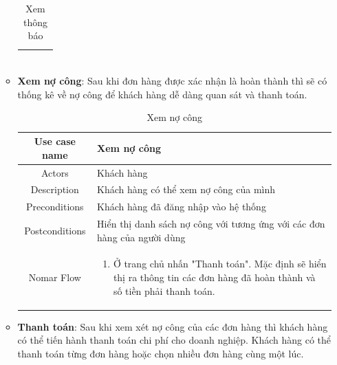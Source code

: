 \begin{itemize}
\begin{itemize}
\begin{table}[!htp]
\begin{tabular}{|c|m{25em}|}
\begin{enumerate}
					\end{enumerate}
					\\
					\hline
				\end{tabular}
				\caption{Xem thông báo}
			\end{table}
		
			\item \textbf{Xem nợ công}: Sau khi đơn hàng được xác nhận là hoàn thành thì sẽ có thống kê về nợ công để khách hàng dễ dàng quan sát và thanh toán.
			
			\begin{table}[!htp]
				\centering\begin{tabular}{|c|m{25em}|}
					\hline 
					Use case name & Xem nợ công\\ 
					\hline 
					Actors & Khách hàng \\ 
					\hline
					Description & Khách hàng có thể xem nợ công của mình \\
					\hline 
					Preconditions & Khách hàng đã đăng nhập vào hệ thống \\
					\hline
					Postconditions & Hiển thị danh sách nợ công với tương ứng với các đơn hàng của người dùng \\
					\hline
					Nomar Flow & \begin{enumerate}
						\item Ở trang chủ nhấn "Thanh toán". Mặc định sẽ hiển thị ra thông tin các đơn hàng đã hoàn thành và số tiền phải thanh toán.
					
						
					\end{enumerate}
					\\
					\hline
				\end{tabular}
				\caption{Xem nợ công}
			\end{table}
		
		\newpage
		
			\item \textbf{Thanh toán}: Sau khi xem xét nợ công của các đơn hàng thì khách hàng có thể tiến hành thanh toán chi phí cho doanh nghiệp. Khách hàng có thể thanh toán từng đơn hàng hoặc chọn nhiều đơn hàng cùng một lúc.
			

\end{itemize}
\end{itemize}
